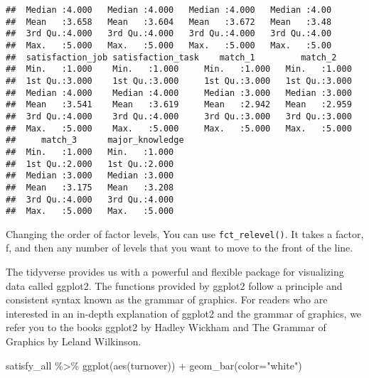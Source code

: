 \documentclass[
]{book}
\newenvironment{Shaded}{\begin{snugshade}}{\end{snugshade}}
\newcommand{\AttributeTok}[1]{\textcolor[rgb]{0.77,0.63,0.00}{#1}}
\newcommand{\FunctionTok}[1]{\textcolor[rgb]{0.00,0.00,0.00}{#1}}
\newcommand{\NormalTok}[1]{#1}
\newcommand{\OtherTok}[1]{\textcolor[rgb]{0.56,0.35,0.01}{#1}}
\newcommand{\SpecialCharTok}[1]{\textcolor[rgb]{0.00,0.00,0.00}{#1}}
\newcommand{\StringTok}[1]{\textcolor[rgb]{0.31,0.60,0.02}{#1}}
\begin{document}
\begin{verbatim}
##  Median :4.000   Median :4.000   Median :4.000   Median :4.00   
##  Mean   :3.658   Mean   :3.604   Mean   :3.672   Mean   :3.48   
##  3rd Qu.:4.000   3rd Qu.:4.000   3rd Qu.:4.000   3rd Qu.:4.00   
##  Max.   :5.000   Max.   :5.000   Max.   :5.000   Max.   :5.00   
##  satisfaction_job satisfaction_task    match_1         match_2     
##  Min.   :1.000    Min.   :1.000     Min.   :1.000   Min.   :1.000  
##  1st Qu.:3.000    1st Qu.:3.000     1st Qu.:3.000   1st Qu.:3.000  
##  Median :4.000    Median :4.000     Median :3.000   Median :3.000  
##  Mean   :3.541    Mean   :3.619     Mean   :2.942   Mean   :2.959  
##  3rd Qu.:4.000    3rd Qu.:4.000     3rd Qu.:3.000   3rd Qu.:3.000  
##  Max.   :5.000    Max.   :5.000     Max.   :5.000   Max.   :5.000  
##     match_3      major_knowledge
##  Min.   :1.000   Min.   :1.000  
##  1st Qu.:2.000   1st Qu.:2.000  
##  Median :3.000   Median :3.000  
##  Mean   :3.175   Mean   :3.208  
##  3rd Qu.:4.000   3rd Qu.:4.000  
##  Max.   :5.000   Max.   :5.000
\end{verbatim}

Changing the order of factor levels, You can use \texttt{fct\_relevel()}. It takes a factor, f, and then any number of levels that you want to move to the front of the line.

\begin{Shaded}
\end{Shaded}

The tidyverse provides us with a powerful and flexible package for visualizing data called ggplot2. The functions provided by ggplot2 follow a principle and consistent syntax known as the grammar of graphics. For readers who are interested in an in-depth explanation of ggplot2 and the grammar of graphics, we refer you to the books ggplot2 by Hadley Wickham and The Grammar of Graphics by Leland Wilkinson.

\begin{Shaded}
\begin{Highlighting}[]
\NormalTok{satisfy\_all }\SpecialCharTok{\%\textgreater{}\%}
  \FunctionTok{ggplot}\NormalTok{(}\FunctionTok{aes}\NormalTok{(turnover)) }\SpecialCharTok{+}
  \FunctionTok{geom\_bar}\NormalTok{(}\AttributeTok{color=}\StringTok{"white"}\NormalTok{)}
\end{Highlighting}
\end{Shaded}
\end{document}
